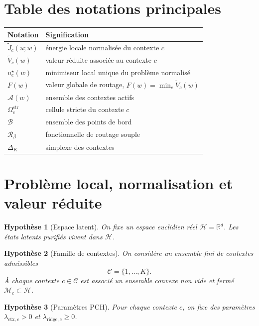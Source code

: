 \documentclass[11pt,a4paper]{article}
\newtheorem{assumption}{Hypothèse}[section]
\newcommand{\R}{\mathbb R}
\newcommand{\Hh}{\mathcal H}
\newcommand{\Mcal}{\mathcal M}
\newcommand{\Ccal}{\mathcal C}
\newcommand{\Rcal}{\mathcal R}
\newcommand{\Acal}{\mathcal A}
\newcommand{\Bcal}{\mathcal B}
\begin{document}
\section*{Table des notations principales}
\begin{center}
\begin{tabular}{@{}ll@{}}
\toprule
Notation & Signification \\ \midrule
\(\widetilde J_c(u;w)\) & énergie locale normalisée du contexte \(c\) \\
\(\widetilde V_c(w)\) & valeur réduite associée au contexte \(c\) \\
\(u_c^\star(w)\) & minimiseur local unique du problème normalisé \\
\(F(w)\) & valeur globale de routage, \(F(w)=\min_c \widetilde V_c(w)\) \\
\(\Acal(w)\) & ensemble des contextes actifs \\
\(\Omega_c^{\mathrm{str}}\) & cellule stricte du contexte \(c\) \\
\(\Bcal\) & ensemble des points de bord \\
\(\Rcal_\beta\) & fonctionnelle de routage souple \\
\(\Delta_K\) & simplexe des contextes \\ \bottomrule
\end{tabular}
\end{center}

\section{Problème local, normalisation et valeur réduite}

\begin{assumption}[Espace latent]
On fixe un espace euclidien réel \(\Hh=\R^d\). Les états latents purifiés vivent dans \(\Hh\).
\end{assumption}

\begin{assumption}[Famille de contextes]
On considère un ensemble fini de contextes admissibles
\[
\Ccal=\{1,\dots,K\}.
\]
À chaque contexte \(c\in\Ccal\) est associé un ensemble convexe non vide et fermé \(\Mcal_c\subset\Hh\).
\end{assumption}

\begin{assumption}[Paramètres PCH]
Pour chaque contexte \(c\), on fixe des paramètres \(\lambda_{\mathrm{ctx},c}>0\) et \(\lambda_{\mathrm{ridge},c}\ge 0\).
\end{assumption}
\end{document}
